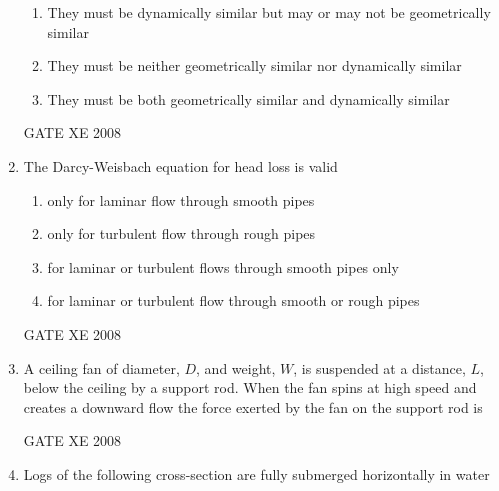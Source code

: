 \documentclass[12pt]{article}
\begin{document}
\begin{enumerate}
\begin{enumerate}
\item  They must be dynamically similar but may or may not be geometrically similar

\item  They must be neither geometrically similar nor dynamically similar

\item  They must be both geometrically similar and dynamically similar
\end{enumerate}

GATE XE 2008
\item  The Darcy-Weisbach equation for head loss is valid

\begin{enumerate}
\item  only for laminar flow through smooth pipes

\item  only for turbulent flow through rough pipes

\item  for laminar or turbulent flows through smooth pipes only

\item  for laminar or turbulent flow through smooth or rough pipes
\end{enumerate}

GATE XE 2008
\item A ceiling fan of diameter, $D$, and weight, $W$, is suspended at a distance, $L$, below the ceiling by a support rod. When the fan spins at high speed and creates a downward flow the force exerted by the fan on the support rod is

\begin{enumerate}
\end{enumerate}

GATE XE 2008
\item Logs of the following cross-section are fully submerged horizontally in water



\end{enumerate}
\end{document}
